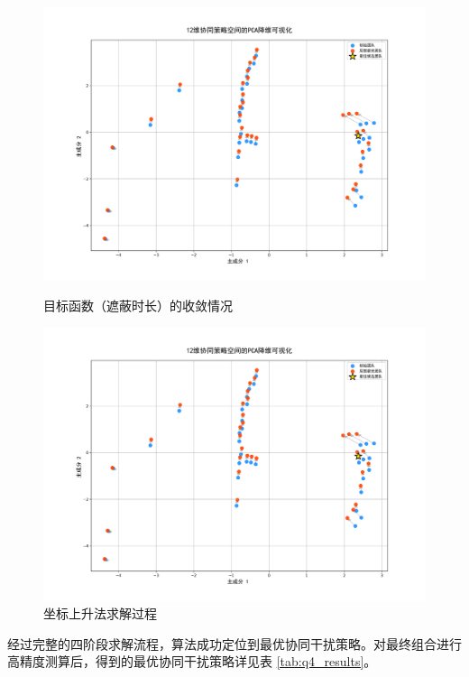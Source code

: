 \documentclass[12pt]{article}
\begin{document}
\begin{CJK}{UTF8}{gbsn}
		\begin{figure}[H]
			\centering
			\begin{minipage}[b]{0.48\textwidth}
				\centering
				\includegraphics[width=\textwidth, height=0.25\textheight]{pic/Fg13.png}
				\caption{目标函数（遮蔽时长）的收敛情况}
				\label{fig:pca_q4_left}
			\end{minipage}
			\hfill
			\begin{minipage}[b]{0.48\textwidth}
				\centering					\includegraphics[width=\textwidth, height=0.25\textheight]{pic/Fg13.png}
				\caption{坐标上升法求解过程}
				\label{fig:pca_q4_right}
			\end{minipage}
		\end{figure}
		
		经过完整的四阶段求解流程，算法成功定位到最优协同干扰策略。对最终组合进行高精度测算后，得到的最优协同干扰策略详见表 \ref{tab:q4_results}。
		

\end{CJK}
\end{document}
